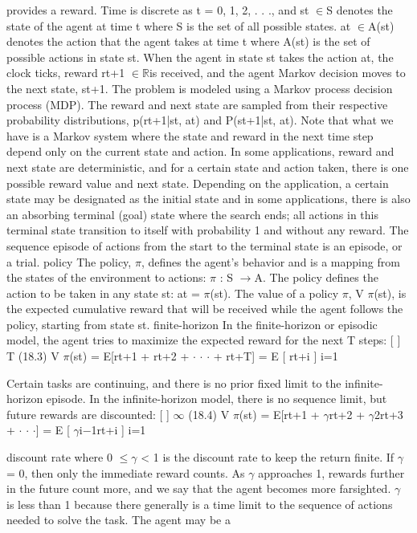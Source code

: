 provides a reward. Time is discrete as t = 0, 1, 2, . . ., and st $\in$S denotes the state of the agent at time t where S is the set of all possible states. at $\in$A(st) denotes the action that the agent takes at time t where A(st) is the set of possible actions in state st. When the agent in state st takes the action at, the clock ticks, reward rt+1 $\in$$\mathbb{R}$is received, and the agent Markov decision moves to the next state, st+1. The problem is modeled using a Markov process decision process (MDP). The reward and next state are sampled from their respective probability distributions, p(rt+1|st, at) and P(st+1|st, at). Note that what we have is a Markov system where the state and reward in the next time step depend only on the current state and action. In some applications, reward and next state are deterministic, and for a certain state and action taken, there is one possible reward value and next state. Depending on the application, a certain state may be designated as the initial state and in some applications, there is also an absorbing terminal (goal) state where the search ends; all actions in this terminal state transition to itself with probability 1 and without any reward. The sequence episode of actions from the start to the terminal state is an episode, or a trial. policy The policy, $\pi$, defines the agent’s behavior and is a mapping from the states of the environment to actions: $\pi$ : S $\to$A. The policy defines the action to be taken in any state st: at = $\pi$(st). The value of a policy $\pi$, V $\pi$(st), is the expected cumulative reward that will be received while the agent follows the policy, starting from state st. finite-horizon In the finite-horizon or episodic model, the agent tries to maximize the expected reward for the next T steps: [ ] T (18.3) V $\pi$(st) = E[rt+1 + rt+2 + $\cdot$ $\cdot$ $\cdot$ + rt+T] = E [ rt+i ] i=1

Certain tasks are continuing, and there is no prior fixed limit to the infinite-horizon episode. In the infinite-horizon model, there is no sequence limit, but future rewards are discounted: [ ] $\infty$ (18.4) V $\pi$(st) = E[rt+1 + $\gamma$rt+2 + $\gamma$2rt+3 + $\cdot$ $\cdot$ $\cdot$] = E [ $\gamma$i$-$1rt+i ] i=1

discount rate where 0 $\leq$$\gamma$ < 1 is the discount rate to keep the return finite. If $\gamma$ = 0, then only the immediate reward counts. As $\gamma$ approaches 1, rewards further in the future count more, and we say that the agent becomes more farsighted. $\gamma$ is less than 1 because there generally is a time limit to the sequence of actions needed to solve the task. The agent may be a

